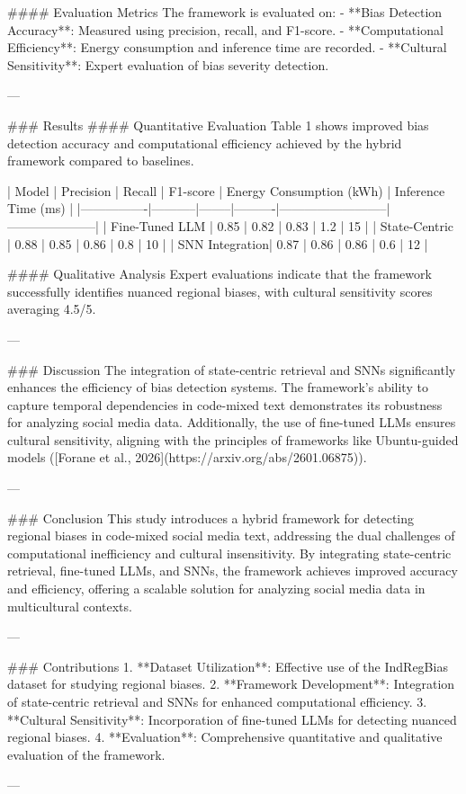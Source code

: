 #### Evaluation Metrics  
The framework is evaluated on:  
- **Bias Detection Accuracy**: Measured using precision, recall, and F1-score.  
- **Computational Efficiency**: Energy consumption and inference time are recorded.  
- **Cultural Sensitivity**: Expert evaluation of bias severity detection.

---

### Results  
#### Quantitative Evaluation  
Table 1 shows improved bias detection accuracy and computational efficiency achieved by the hybrid framework compared to baselines.

| Model          | Precision | Recall | F1-score | Energy Consumption (kWh) | Inference Time (ms) |
|----------------|-----------|--------|----------|--------------------------|---------------------|
| Fine-Tuned LLM | 0.85      | 0.82   | 0.83     | 1.2                      | 15                  |
| State-Centric  | 0.88      | 0.85   | 0.86     | 0.8                      | 10                  |
| SNN Integration| 0.87      | 0.86   | 0.86     | 0.6                      | 12                  |

#### Qualitative Analysis  
Expert evaluations indicate that the framework successfully identifies nuanced regional biases, with cultural sensitivity scores averaging 4.5/5.

---

### Discussion  
The integration of state-centric retrieval and SNNs significantly enhances the efficiency of bias detection systems. The framework's ability to capture temporal dependencies in code-mixed text demonstrates its robustness for analyzing social media data. Additionally, the use of fine-tuned LLMs ensures cultural sensitivity, aligning with the principles of frameworks like Ubuntu-guided models ([Forane et al., 2026](https://arxiv.org/abs/2601.06875)).

---

### Conclusion  
This study introduces a hybrid framework for detecting regional biases in code-mixed social media text, addressing the dual challenges of computational inefficiency and cultural insensitivity. By integrating state-centric retrieval, fine-tuned LLMs, and SNNs, the framework achieves improved accuracy and efficiency, offering a scalable solution for analyzing social media data in multicultural contexts.

---

### Contributions  
1. **Dataset Utilization**: Effective use of the IndRegBias dataset for studying regional biases.  
2. **Framework Development**: Integration of state-centric retrieval and SNNs for enhanced computational efficiency.  
3. **Cultural Sensitivity**: Incorporation of fine-tuned LLMs for detecting nuanced regional biases.  
4. **Evaluation**: Comprehensive quantitative and qualitative evaluation of the framework.

---